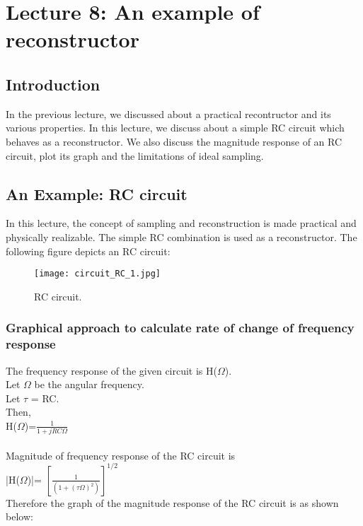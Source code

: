 \section{Lecture 8: An example of reconstructor }

\subsection{Introduction}
In the previous lecture, we discussed about a practical recontructor and its various properties. In this lecture, we discuss about a simple RC circuit which behaves as a reconstructor. We also discuss the magnitude response of an RC circuit, plot its graph and the limitations of ideal sampling.  

\subsection{An Example: RC circuit}
\label{sec:examples}
In this lecture, the concept of sampling and reconstruction is made practical and physically realizable. The simple RC combination is used as a reconstructor. The following figure depicts an RC circuit:


\begin{figure}[ht]
\centering
\texttt{[image: circuit\_RC\_1.jpg]}
\caption{\label{fig:1} RC circuit.}
\end{figure}

\subsubsection{Graphical approach to calculate rate of change of frequency response}

\noindent The frequency response of the given circuit is H($\Omega$).\\
Let $\Omega$ be the angular frequency.\\
Let $\tau$ = RC.\\
Then,\\ 
H($\Omega$)=$\frac{1}{1+jRC\Omega}$\\
\\
\large Magnitude of frequency response of the RC circuit is  \\

|H($\Omega$)|= $[\frac{1}{(1+(\tau \Omega)^2)}]^{1/2}$\\

\noindent Therefore the graph of the magnitude response of the RC circuit is as shown below:\\


